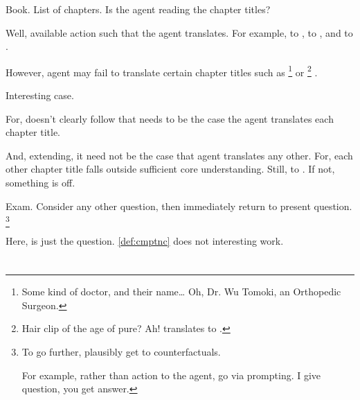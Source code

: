 \begin{note}
  \begin{illustration}[Translation]
    Book.
    List of chapters.
    Is the agent reading the chapter titles?
  \end{illustration}

  Well, available action such that the agent translates.
  For example,  to ,  to , and  to .

  However, agent may fail to translate certain chapter titles such as %
  \footnote{
    Some kind of doctor, and their name\dots
    Oh, Dr. Wu Tomoki, an Orthopedic Surgeon.
  }
  or %
  \footnote{
    Hair clip of the age of pure?
    Ah!  translates to .
  }%
  .

  Interesting case.

  For, doesn't clearly follow that needs to be the case the agent translates each chapter title.

  And, extending, it need not be the case that agent translates any other.
  For, each other chapter title falls outside sufficient core understanding.
  Still,  to .
  If not, something is off.
\end{note}

\begin{note}
  \begin{illustration}[Focus]
    Exam.
    Consider any other question, then immediately return to present question.%
    \footnote{
      To go further, plausibly get to counterfactuals.

      For example, rather than action to the agent, go via prompting.
      I give question, you get answer.
    }
  \end{illustration}

  Here, \tRep{} is just the question.
  \autoref{def:cmptnc} does not interesting work.
\end{note}

\section{}
\label{cha:typical:sec:tC}

